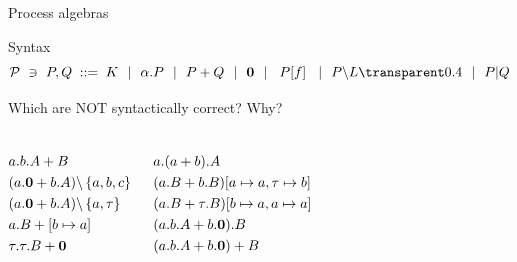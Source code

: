 \documentclass[aspectratio=169]{beamer}
\begin{document}

\begin{slide}{Process algebras}
\small

\begin{block}{Syntax}
\begin{equation*}
\mathcal{P} ~\ni~ P,Q\; ::=\; K ~~|~~ \alpha.P ~~|~~ P + Q ~~|~~ \cnil
        ~~|~~ \crn P f  ~~|~~ P\backslash L \faded{~~|~~ P|Q}
\end{equation*}
\end{block}

\begin{exampleblock}{\exercise Which are NOT syntactically correct? Why?}
\begin{columns}
  \begin{align}
    & a.b.A+B\\&
    (a.\cnil + b.A) \backslash \set{a,b,c}\\&
    (a.\cnil + b.A) \backslash \set{a,\tau}\\& %
    a.B+[b\mapsto a]\\& %
    \tau.\tau.B + \cnil
  \end{align}

  \begin{align} &
    a.(a + b).A\\&
    (a.B + b.B)[a\mapsto a,\tau\mapsto b]\\&
    (a.B + \tau.B)[b\mapsto a,a\mapsto a]\\& %
    (a.b.A + b.\cnil).B\\&
    (a.b.A + b.\cnil)+B
  \end{align}
\end{columns}
\end{exampleblock}

\end{slide}

\end{document}
